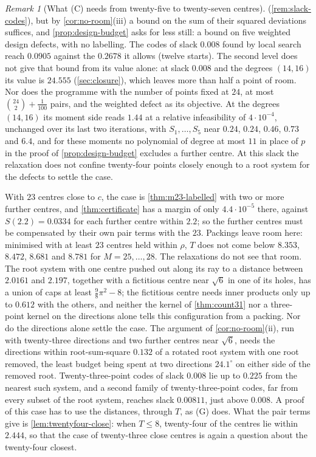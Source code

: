 \documentclass[11pt,reqno]{amsart}
\renewcommand{\_}{\origunderscore\allowbreak}
\numberwithin{equation}{section}
\theoremstyle{plain}
\theoremstyle{definition}
\theoremstyle{remark}
\newtheorem{remark}[thm]{Remark}
\begin{document}
\begin{remark}[What (C) needs from twenty-five to twenty-seven centres]
(\cref{rem:slack-codes}), but by \cref{cor:no-room}(iii) a bound on the sum
of their squared deviations suffices, and \cref{prop:design-budget} asks
for less still: a bound on five weighted design defects, with no labelling.
The codes of slack $0.008$ found by local search reach $0.0905$ against the
$0.2678$ it allows (twelve starts). The second level does not give that
bound from its value alone: at slack $0.008$ and the degrees $(14,16)$ its
value is $24.555$ (\cref{sec:closure}), which leaves more than half a point
of room. Nor does the programme with the number of points fixed at $24$,
at most $\binom{24}2+\frac1{100}$ pairs, and the weighted defect as its
objective. At the degrees $(14,16)$ its moment side reads $1.44$ at a
relative infeasibility of $4\cdot10^{-4}$, unchanged over its last two
iterations, with $S_1,\dots,S_5$ near $0.24$, $0.24$, $0.46$, $0.73$ and
$6.4$, and for these moments no polynomial of degree at most $11$ in place
of $p$ in the proof of \cref{prop:design-budget} excludes a further centre.
At this slack the relaxation does not confine twenty-four points closely
enough to a root system for the defects to settle the case.

With $23$ centres close to $c$, the case is \cref{thm:m23-labelled} with
two or more further centres, and \cref{thm:certificate} has a margin of only
$4.4\cdot10^{-5}$ there, against $S(2.2)=0.0334$ for each further centre
within $2.2$; so the further centres must be compensated by their own pair
terms with the $23$. Packings leave room here: minimised with at least $23$
centres held within $\rho$, $T$ does not come below $8.353$, $8.472$,
$8.681$ and $8.781$ for $M=25,\dots,28$. The relaxations do
not see that room. The root system with one centre pushed out along its ray
to a distance between $2.0161$ and $2.197$, together with a fictitious
centre near $\sqrt6$ in one of its holes, has a union of caps at least
$\frac98\pi^2-8$; the fictitious centre needs inner products only up to
$0.612$ with the others, and neither the kernel of \cref{thm:count31} nor a
three-point kernel on the directions alone tells this configuration from a
packing. Nor do the directions alone settle the case. The argument of
\cref{cor:no-room}(ii), run with twenty-three directions and two further
centres near $\sqrt6$, needs the directions within root-sum-square $0.132$
of a rotated root system with one root removed, the least budget being
spent at two directions $24.1^\circ$ on either side of the removed root.
Twenty-three-point codes of slack $0.008$ lie up to $0.225$ from the
nearest such system, and a second family of twenty-three-point codes, far
from every subset of the root system, reaches slack $0.00811$, just above
$0.008$. A proof of this case has to use the distances, through $T$, as (G)
does. What the pair terms give is \cref{lem:twentyfour-close}: when $T\le8$,
twenty-four of the centres lie within $2.444$, so that the case of
twenty-three close centres is again a question about the twenty-four
closest.


\end{remark}
\end{document}
